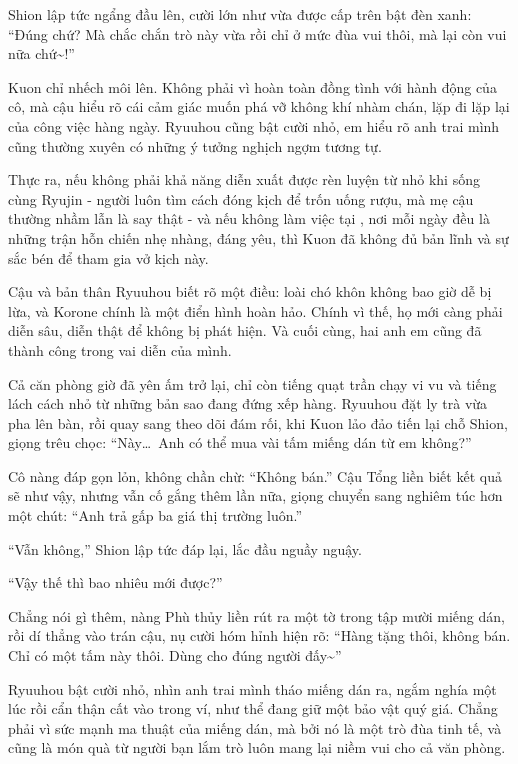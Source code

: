 \documentclass[../main.tex]{subfiles}
\begin{document}
Shion lập tức ngẩng đầu lên, cười lớn như vừa được cấp trên bật đèn xanh: ``Đúng chứ? Mà chắc chắn trò này vừa rồi chỉ ở mức đùa vui thôi, mà lại còn vui nữa chứ\~{}!''

Kuon chỉ nhếch môi lên. Không phải vì hoàn toàn đồng tình với hành động của cô, mà cậu hiểu rõ cái cảm giác muốn phá vỡ không khí nhàm chán, lặp đi lặp lại của công việc hàng ngày. Ryuuhou cũng bật cười nhỏ, em hiểu rõ anh trai mình cũng thường xuyên có những ý tưởng nghịch ngợm tương tự.

Thực ra, nếu không phải khả năng diễn xuất được rèn luyện từ nhỏ khi sống cùng Ryujin - người luôn tìm cách đóng kịch để trốn uống rượu, mà mẹ cậu thường nhầm lẫn là say thật - và nếu không làm việc tại \hll, nơi mỗi ngày đều là những trận hỗn chiến nhẹ nhàng, đáng yêu, thì Kuon đã không đủ bản lĩnh và sự sắc bén để tham gia vở kịch này.

Cậu và bản thân Ryuuhou biết rõ một điều: loài chó khôn không bao giờ dễ bị lừa, và Korone chính là một điển hình hoàn hảo. Chính vì thế, họ mới càng phải diễn sâu, diễn thật để không bị phát hiện. Và cuối cùng, hai anh em cũng đã thành công trong vai diễn của mình.

\ct

Cả căn phòng giờ đã yên ấm trở lại, chỉ còn tiếng quạt trần chạy vi vu và tiếng lách cách nhỏ từ những bản sao đang đứng xếp hàng. Ryuuhou đặt ly trà vừa pha lên bàn, rồi quay sang theo dõi đám rối, khi Kuon lảo đảo tiến lại chỗ Shion, giọng trêu chọc: ``Này\dots\ Anh có thể mua vài tấm miếng dán từ em không?''

Cô nàng đáp gọn lỏn, không chần chừ: ``Không bán.'' Cậu Tổng liền biết kết quả sẽ như vậy, nhưng vẫn cố gắng thêm lần nữa, giọng chuyển sang nghiêm túc hơn một chút: ``Anh trả gấp ba giá thị trường luôn.''

``Vẫn không,'' Shion lập tức đáp lại, lắc đầu nguầy nguậy.

``Vậy thế thì bao nhiêu mới được?''

Chẳng nói gì thêm, nàng Phù thủy liền rút ra một tờ trong tập mười miếng dán, rồi dí thẳng vào trán cậu, nụ cười hóm hỉnh hiện rõ: ``Hàng tặng thôi, không bán. Chỉ có một tấm này thôi. Dùng cho đúng người đấy\~{}''

Ryuuhou bật cười nhỏ, nhìn anh trai mình tháo miếng dán ra, ngắm nghía một lúc rồi cẩn thận cất vào trong ví, như thể đang giữ một bảo vật quý giá. Chẳng phải vì sức mạnh ma thuật của miếng dán, mà bởi nó là một trò đùa tinh tế, và cũng là món quà từ người bạn lắm trò luôn mang lại niềm vui cho cả văn phòng.
\end{document}
